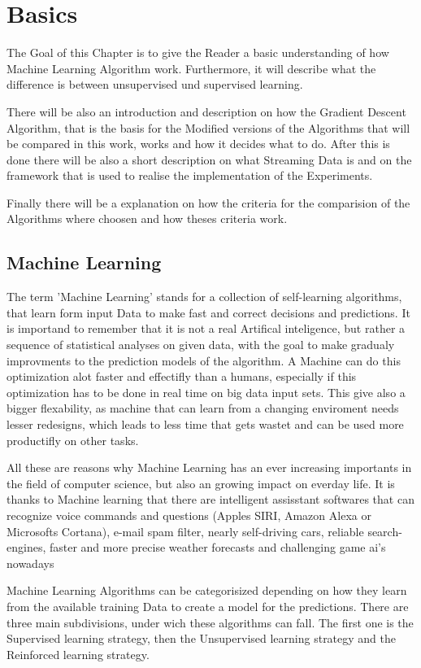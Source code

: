 \documentclass[12pt,oneside,a4paper,parskip]{scrbook}
\begin{document}
\chapter{Basics}
The Goal of this Chapter is to give the Reader a basic understanding of how Machine Learning Algorithm work. 
Furthermore, it will describe what the difference is between unsupervised und supervised learning. 

There will be also an introduction and description on how the Gradient Descent Algorithm, that is the basis for the 
Modified versions of the Algorithms that will be compared in this work, works and how it decides what to do. 
After this is done there will be also a short description on what Streaming Data is and on the framework that is used to 
realise the implementation of the Experiments.

Finally there will be a explanation on how the criteria for the comparision of the Algorithms where choosen and how 
theses criteria work.

\section{Machine Learning}

The term 'Machine Learning' stands for a collection of self-learning algorithms, that learn form input Data to make 
fast and correct decisions and predictions. It is importand to remember that it is not a real Artifical inteligence, 
but rather a sequence of statistical analyses on given data, with the goal to make gradualy improvments to the prediction 
models of the algorithm.  
A Machine can do this optimization alot faster and effectifly than a humans, especially if this optimization has to be 
done in real time on big data input sets. This give also a bigger flexability, as machine that can learn from a changing 
enviroment needs lesser redesigns, which leads to less time that gets wastet and can be used more productifly on other 
tasks. 

All these are reasons why Machine Learning has an ever increasing importants in the field of computer science, 
but also an growing impact on everday life. It is thanks to Machine learning that there are intelligent assisstant 
softwares that can recognize voice commands and questions (Apples SIRI, Amazon Alexa or Microsofts Cortana),
e-mail spam filter, nearly self-driving cars, reliable search-engines, faster and more precise weather forecasts and 
challenging game ai's nowadays 

Machine Learning Algorithms can be categorisized depending on how they learn from the available training Data to create 
a model for the predictions. There are three main subdivisions, under wich these algorithms can fall. 
The first one is the Supervised learning strategy, then the Unsupervised learning strategy and the Reinforced learning 
strategy. 
\end{document}
